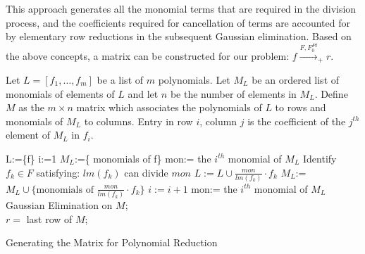 This approach generates all the monomial terms that are required
in the division process, 
and the coefficients required for cancellation of terms are accounted
for by elementary row reductions in the subsequent Gaussian elimination. 
Based on the above concepts, a matrix can be constructed for our
problem: $f\stackrel{F,F_0^{PI}}{\longrightarrow}_+r$. 

\begin{Definition}
Let $L = \left [f_1, \dots, f_m \right]$ be a list of $m$ polynomials. Let
$M_L$ be an ordered list of monomials of elements of $L$ and let $n$
be the number of elements in $M_L$. Define $M$ as the $m \times n$
matrix which associates the polynomials of $L$ to rows and monomials
of $M_L$ to columns. Entry in row $i$, column $j$ is the coefficient of the
$j^{th}$ element of $M_L$ in $f_i$. 
\end{Definition}





\begin{algorithm}[hbt]
\SetAlgoNoLine

        L:=\{f\} \;{}
        i:=1\;
        $M_{L}$:=\{ monomials of f\} \;{}
        mon:= the $i^{th}$ monomial of $M_{L}$\;
                {
                        Identify $f_{k} \in F$ satisfying: $lm(f_{k})$ can divide $mon$ \;
                        $L:=L \cup \frac{mon}{lm(f_{k})}\cdot f_{k}$ \;
                        $M_{L}$:=$M_{L} \cup \{ \text{monomials of }
                        \frac{mon}{lm(f_{k})}\cdot f_{k}\}$ \;{} 
                        $i:=i+1$\;{}
                        mon:= the $i^{th}$ monomial of $M_{L}$\;
                }
         Gaussian Elimination on $M$;\\
         \Return $r =$ last row of $M$;
\caption{Generating the Matrix for Polynomial Reduction}\label{alg:matrix}
\end{algorithm}



